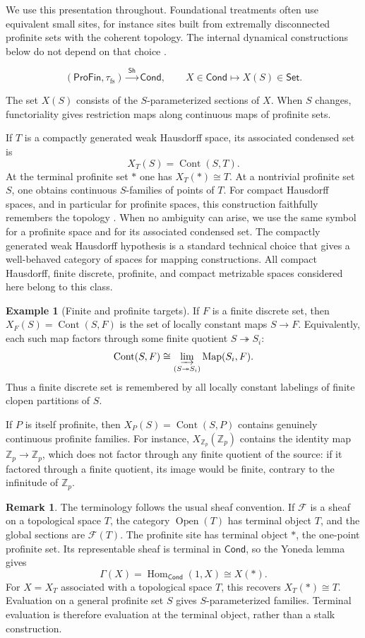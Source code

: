 \documentclass[10pt]{amsart}
\newcommand{\ProFin}{\mathsf{ProFin}}
\newcommand{\Set}{\mathsf{Set}}
\newcommand{\Cond}{\mathsf{Cond}}
\newcommand{\Sh}{\mathsf{Sh}}
\newcommand{\Cont}{\operatorname{Cont}}
\newcommand{\Zp}{\mathbb{Z}_p}
\theoremstyle{plain}
\theoremstyle{definition}
\newtheorem{example}[theorem]{Example}
\newtheorem{remark}[theorem]{Remark}
\begin{document}
We use this presentation throughout. Foundational treatments
often use equivalent small sites, for instance sites built from extremally
disconnected profinite sets with the coherent topology. The internal dynamical
constructions below do not depend on that choice
\cite{ClausenScholze,LeStumCondensed}.

\[
  (\ProFin,\tau_{\mathrm{fs}})\xrightarrow{\ \Sh\ }\Cond,
  \qquad
  X\in\Cond\longmapsto X(S)\in\Set .
\]

The set $X(S)$ consists of the $S$-parameterized sections of $X$.
When $S$ changes, functoriality gives restriction maps along continuous maps of
profinite sets.

If $T$ is a compactly generated weak Hausdorff space, its associated condensed
set is
\[
  X_T(S)=\Cont(S,T).
\]
At the terminal profinite set $*$ one has $X_T(*)\cong T$. At a nontrivial
profinite set $S$, one obtains continuous $S$-families of points of $T$.
For compact Hausdorff spaces, and in particular for profinite spaces, this
construction faithfully remembers the topology
\cite{ClausenScholze,LeStumCondensed}.
When no ambiguity can arise, we use the same symbol for a profinite space and
for its associated condensed set.
The compactly generated weak Hausdorff hypothesis is a standard technical
choice that gives a well-behaved category of spaces for mapping constructions.
All compact Hausdorff, finite discrete, profinite, and compact metrizable
spaces considered here belong to this class.

\begin{example}[Finite and profinite targets]
If $F$ is a finite discrete set, then $X_F(S)=\Cont(S,F)$ is the set of locally
constant maps $S\to F$. Equivalently, each such map factors through some finite
quotient $S\twoheadrightarrow S_i$:
\[
  \Cont(S,F)\cong
  \varinjlim_{(S\twoheadrightarrow S_i)}\operatorname{Map}(S_i,F).
\]
Thus a finite discrete set is remembered by all locally constant labelings of
finite clopen partitions of $S$.

If $P$ is itself profinite, then $X_P(S)=\Cont(S,P)$ contains genuinely
continuous profinite families. For instance, $X_{\Zp}(\Zp)$ contains the
identity map $\Zp\to\Zp$, which does not factor through any finite quotient of
the source: if it factored through a finite quotient, its image would be finite,
contrary to the infinitude of $\Zp$.
\end{example}

\begin{remark}
The terminology follows the usual sheaf convention. If $\mathcal F$ is a sheaf
on a topological space $T$, the category $\operatorname{Open}(T)$ has terminal
object $T$, and the global sections are $\mathcal F(T)$. The profinite site has
terminal object $*$, the one-point profinite set. Its representable sheaf is
terminal in $\Cond$, so the Yoneda lemma gives
\[
  \Gamma(X)=\operatorname{Hom}_{\Cond}(1,X)\cong X(*).
\]
For $X=X_T$ associated with a topological space $T$, this recovers
$X_T(*)\cong T$. Evaluation on a general profinite set $S$ gives
$S$-parameterized families. Terminal evaluation is therefore evaluation at the
terminal object, rather than a stalk construction.
\end{remark}
\end{document}
